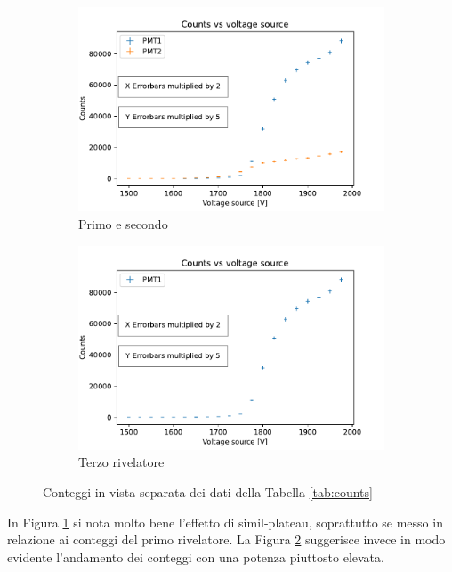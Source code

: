 \documentclass[10pt,a4paper]{article}
\begin{document}
\begin{figure}[h]
\begin{subfigure}{.49\columnwidth}
  \centering
  \includegraphics[width=\linewidth]{img/counts12_new.pdf}
  \caption{Primo e secondo}
  \label{fig:counts_12}
\end{subfigure}%
\hfill
\begin{subfigure}{.49\columnwidth}
  \centering
  \includegraphics[width=\linewidth]{img/counts1_new.pdf}
  \caption{Terzo rivelatore}
  \label{fig:counts_3}
\end{subfigure}
\caption{Conteggi in vista separata dei dati della Tabella \ref{tab:counts}}
\label{fig:counts_sep}
\end{figure}

In Figura \ref{fig:counts_12} si nota molto bene l'effetto di simil-plateau, soprattutto se messo in relazione ai conteggi del primo rivelatore. La Figura \ref{fig:counts_3} suggerisce invece in modo evidente l'andamento dei conteggi con una potenza piuttosto elevata. 
\end{document}
